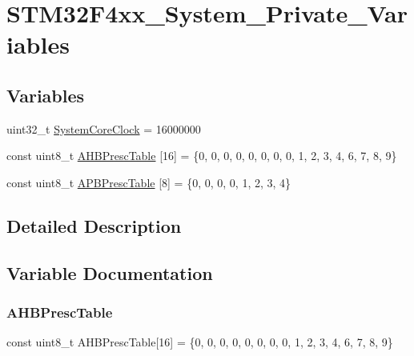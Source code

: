 \hypertarget{group__STM32F4xx__System__Private__Variables}{}\section{S\+T\+M32\+F4xx\+\_\+\+System\+\_\+\+Private\+\_\+\+Variables}
\label{group__STM32F4xx__System__Private__Variables}
\subsection*{Variables}
\begin{DoxyCompactItemize}
\item 
uint32\+\_\+t \hyperlink{group__STM32F4xx__System__Private__Variables_gaa3cd3e43291e81e795d642b79b6088e6}{System\+Core\+Clock} = 16000000
\item 
const uint8\+\_\+t \hyperlink{group__STM32F4xx__System__Private__Variables_ga6e1d9cd666f0eacbfde31e9932a93466}{A\+H\+B\+Presc\+Table} \mbox{[}16\mbox{]} = \{0, 0, 0, 0, 0, 0, 0, 0, 1, 2, 3, 4, 6, 7, 8, 9\}
\item 
const uint8\+\_\+t \hyperlink{group__STM32F4xx__System__Private__Variables_ga5b4f8b768465842cf854a8f993b375e9}{A\+P\+B\+Presc\+Table} \mbox{[}8\mbox{]} = \{0, 0, 0, 0, 1, 2, 3, 4\}
\end{DoxyCompactItemize}


\subsection{Detailed Description}


\subsection{Variable Documentation}
\mbox{\label{group__STM32F4xx__System__Private__Variables_ga6e1d9cd666f0eacbfde31e9932a93466}} 
\subsubsection{\texorpdfstring{A\+H\+B\+Presc\+Table}{AHBPrescTable}}
{\footnotesize\ttfamily const uint8\+\_\+t A\+H\+B\+Presc\+Table\mbox{[}16\mbox{]} = \{0, 0, 0, 0, 0, 0, 0, 0, 1, 2, 3, 4, 6, 7, 8, 9\}}

